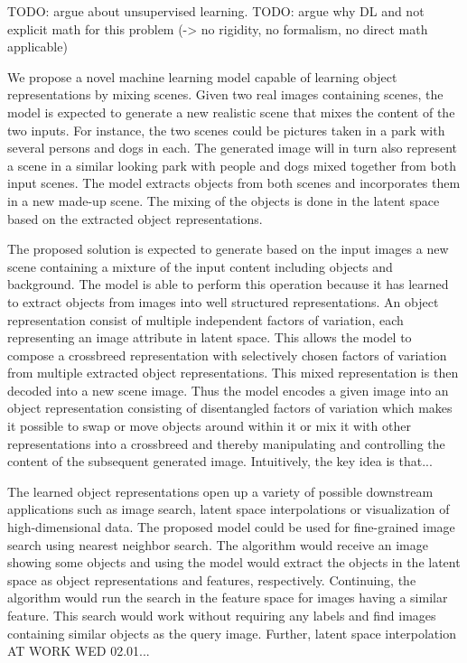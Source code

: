 \documentclass[12pt,a4paper]{article}
\begin{document}
TODO: argue about unsupervised learning.
TODO: argue why DL and not explicit math for this problem (-> no rigidity, no formalism, no direct math applicable)

We propose a novel machine learning model capable of learning object representations by mixing scenes. Given two real images containing scenes, the model is expected to generate a new realistic scene that mixes the content of the two inputs. For instance, the two scenes could be pictures taken in a park with several persons and dogs in each. The generated image will in turn also represent a scene in a similar looking park with people and dogs mixed together from both input scenes. The model extracts objects from both scenes and incorporates them in a new made-up scene. The mixing of the objects is done in the latent space based on the extracted object representations.

The proposed solution is expected to generate based on the input images a new scene containing a mixture of the input content including objects and background. The model is able to perform this operation because it has learned to extract objects from images into well structured representations. An object representation consist of multiple independent factors of variation, each representing an image attribute in latent space. This allows the model to compose a crossbreed representation with selectively chosen factors of variation from multiple extracted object representations. This mixed representation is then decoded into a new scene image. Thus the model encodes a given image into an object representation consisting of disentangled factors of variation which makes it possible to swap or move objects around within it or mix it with other representations into a crossbreed and thereby manipulating and controlling the content of the subsequent generated image. 
Intuitively, the key idea is that...

The learned object representations open up a variety of possible downstream applications such as image search, latent space interpolations or visualization of high-dimensional data. The proposed model could be used for fine-grained image search using nearest neighbor search. The algorithm would receive an image showing some objects and using the model would extract the objects in the latent space as object representations and features, respectively. Continuing, the algorithm would run the search in the feature space for images having a similar feature. This search would work without requiring any labels and find images containing similar objects as the query image. Further, latent space interpolation AT WORK WED 02.01...
\end{document}
